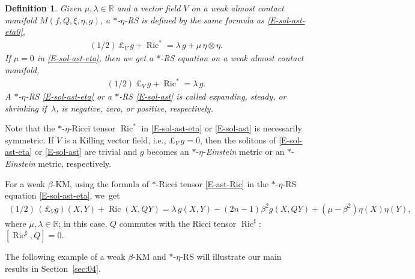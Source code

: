 \documentclass[11pt,a4paper,twoside]{article}
\newtheorem{definition}{Definition}%
\def\Ric{\operatorname{Ric}}
\begin{document}
{\begin{definition}\rm
Given $\mu,\lambda\in\mathbb{R}$ and a vector field $V$ on a weak almost contact manifold $M(f,Q,\xi,\eta,g)$,
a $\ast$-$\eta$-{\em RS} is defined by the same formula as \eqref{E-sol-ast-eta0},
\begin{align}\label{E-sol-ast-eta}
 (1/2)\,\pounds_V\,g+\Ric^\ast = \lambda\,g + \mu\,\eta\otimes\eta .
\end{align}
If $\mu=0$ in \eqref{E-sol-ast-eta}, then we get a $\ast$-{\em RS} equation on a weak almost contact manifold,
\begin{align}\label{E-sol-ast}
 (1/2)\,\pounds_V\,g+\Ric^\ast =\lambda\,g.
\end{align}
A $\ast$-$\eta$-RS \eqref{E-sol-ast-eta} or a $\ast$-{RS} \eqref{E-sol-ast}
is called \textit{expanding}, \textit{steady}, or \textit{shrinking} if $\,\lambda$, is negative, zero, or positive, respectively.
\end{definition}

Note that the $\ast$-$\eta$-Ricci tensor $\Ric^\ast$ in \eqref{E-sol-ast-eta} or \eqref{E-sol-ast} is necessarily symmetric.
If $V$ is a Killing vector field, i.e., $\pounds_V\,g=0$, then the solitons of \eqref{E-sol-ast-eta} or \eqref{E-sol-ast} are trivial and $g$ becomes an $\ast$-$\eta$-{\em Einstein} metric or an $\ast$-{\em Einstein} metric, respectively.

For a weak $\beta$-KM, using the formula of $\ast$-Ricci tensor \eqref{E-ast-Ric} in the $\ast$-$\eta$-RS equation \eqref{E-sol-ast-eta}, we~get
\begin{align}\label{E-sol-eta2}
 (1/2)\,(\pounds_V g)(X,Y) + \Ric(X,QY) = \lambda\,g(X,Y) - (2n-1)\beta^2 g(X,QY) + (\mu-\beta^2)\eta(X)\eta(Y) ,
\end{align}
where $\mu,\lambda\in\mathbb{R}$; in this case, $Q$ commutes with the Ricci tensor $\Ric^\sharp$: $[\Ric^\sharp, Q]=0$.


The following example of a weak $\beta$-KM and $\ast$-$\eta$-{RS} will illustrate our main results in Section~\ref{sec:04}.

}
\end{document}
